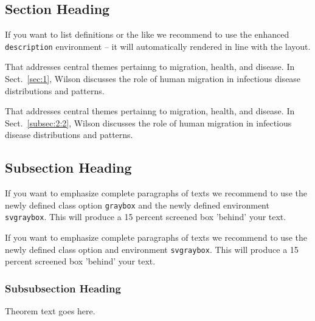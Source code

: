 \begin{bibunit}
	\section{Section Heading}\label{sec:3}
	
	
	If you want to list definitions or the like we recommend to use the enhanced \verb|description| environment -- it will automatically rendered in line with the layout.
	
	\begin{description}[Type 1]
		\item[Type 1]{That addresses central themes pertainng to migration, health, and disease. In Sect.~\ref{sec:1}, Wilson discusses the role of human migration in infectious disease distributions and patterns.}
		\item[Type 2]{That addresses central themes pertainng to migration, health, and disease. In Sect.~\ref{subsec:2:2}, Wilson discusses the role of human migration in infectious disease distributions and patterns.}
	\end{description}
	
	\subsection{Subsection Heading}\label{subsec:3:1}
	
	\lipsum
	
	\begin{svgraybox}
		If you want to emphasize complete paragraphs of texts we recommend to use the newly defined class option \verb|graybox| and the newly defined environment \verb|svgraybox|. This will produce a 15 percent screened box 'behind' your text.
		
		If you want to emphasize complete paragraphs of texts we recommend to use the newly defined class option and environment \verb|svgraybox|. This will produce a 15 percent screened box 'behind' your text.
	\end{svgraybox}
	
	
	\subsubsection{Subsubsection Heading}\label{subsubsec:3:1:1}
	
	\begin{theorem}
		Theorem text goes here.
	\end{theorem}
	

\end{bibunit}
